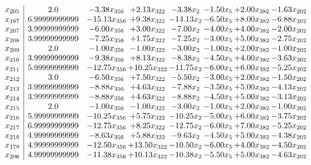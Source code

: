 \documentclass[8pt]{article}
\begin{document}
\[\begin{array}{c| c c@{\hskip 2pt} c@{\hskip 2pt} c@{\hskip 2pt} c@{\hskip 2pt} c@{\hskip 2pt} c@{\hskip 2pt} }
 x_{205}   &  2.0 & -3.38 x_{356} & +  2.13 x_{322} & -3.38 x_{2} & -1.50 x_{5} & +  2.00 x_{382} & -1.63 x_{202}\\
 x_{197}   &  6.99999999999 & -15.13 x_{356} & +  9.38 x_{322} & -14.13 x_{2} & -6.50 x_{5} & +  8.00 x_{382} & -6.88 x_{202}\\
 x_{207}   &  3.99999999999 & -6.00 x_{356} & +  3.00 x_{322} & -7.00 x_{2} & -4.00 x_{5} & +  4.00 x_{382} & -2.00 x_{202}\\
 x_{208}   &  3.99999999999 & -7.25 x_{356} & +  1.75 x_{322} & -7.25 x_{2} & -3.00 x_{5} & +  5.00 x_{382} & -2.75 x_{202}\\
 x_{209}   &  2.0 & -1.00 x_{356} & -1.00 x_{322} & -3.00 x_{2} & -1.00 x_{5} & +  2.00 x_{382} & -1.00 x_{202}\\
 x_{210}   &  3.99999999999 & -9.38 x_{356} & +  8.13 x_{322} & -8.38 x_{2} & -4.50 x_{5} & +  4.00 x_{382} & -3.63 x_{202}\\
 x_{211}   &  5.99999999999 & -12.75 x_{356} & + 10.25 x_{322} & -11.75 x_{2} & -6.00 x_{5} & +  6.00 x_{382} & -5.25 x_{202}\\
 x_{212}   &  3.0 & -6.50 x_{356} & +  7.50 x_{322} & -5.50 x_{2} & -3.00 x_{5} & +  2.00 x_{382} & -1.50 x_{202}\\
 x_{213}   &  3.99999999999 & -8.88 x_{356} & +  4.63 x_{322} & -7.88 x_{2} & -3.50 x_{5} & +  5.00 x_{382} & -4.13 x_{202}\\
 x_{214}   &  3.99999999999 & -8.88 x_{356} & +  4.63 x_{322} & -8.88 x_{2} & -4.50 x_{5} & +  5.00 x_{382} & -3.13 x_{202}\\
 x_{215}   &  2.0 & -1.00 x_{356} & -1.00 x_{322} & -3.00 x_{2} & -1.00 x_{5} & +  2.00 x_{382} & -1.00 x_{202}\\
 x_{216}   &  5.99999999999 & -10.25 x_{356} & +  5.75 x_{322} & -10.25 x_{2} & -5.00 x_{5} & +  6.00 x_{382} & -3.75 x_{202}\\
 x_{217}   &  6.99999999999 & -12.75 x_{356} & +  8.25 x_{322} & -12.75 x_{2} & -6.00 x_{5} & +  7.00 x_{382} & -5.25 x_{202}\\
 x_{218}   &  4.99999999999 & -8.63 x_{356} & +  5.88 x_{322} & -9.63 x_{2} & -4.50 x_{5} & +  5.00 x_{382} & -4.38 x_{202}\\
 x_{179}   &  4.99999999999 & -12.50 x_{356} & + 13.50 x_{322} & -10.50 x_{2} & -6.00 x_{5} & +  4.00 x_{382} & -4.50 x_{202}\\
 x_{206}   &  4.99999999999 & -11.38 x_{356} & + 10.13 x_{322} & -10.38 x_{2} & -5.50 x_{5} & +  5.00 x_{382} & -4.63 x_{202}\\

\end{array}\]
\end{document}
